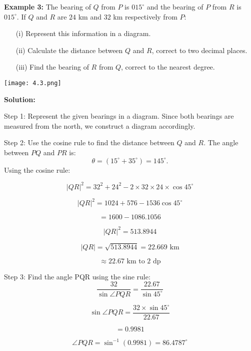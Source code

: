 \begin{flushleft}
	\textbf{Example 3:} The bearing of $Q$ from $P$ is $015^\circ$ and the bearing of $P$ from $R$ is $015^\circ$. If $Q$ and $R$ are $24$ km and $32$ km respectively from $P$:
	
	\begin{enumerate}
		\item[(i)] Represent this information in a diagram.
		\item[(ii)] Calculate the distance between $Q$ and $R$, correct to two decimal places.
		\item[(iii)] Find the bearing of $R$ from $Q$, correct to the nearest degree.
	\end{enumerate}
	
	\vspace{0.5cm}
	\begin{center}
		\texttt{[image: 4.3.png]}
	\end{center}
	
	\textbf{Solution:}
	\vspace{0.5cm}
	
	Step 1: Represent the given bearings in a diagram. Since both bearings are measured from the north, we construct a diagram accordingly.
	
	Step 2: Use the cosine rule to find the distance between $Q$ and $R$. The angle between $PQ$ and $PR$ is:
	\[
	\theta = (15^\circ + 35^\circ) = 145^\circ.
	\]
	Using the cosine rule:
	
	\[
	|QR|^2 = 32^2 + 24^2 - 2 \times 32 \times 24 \times \cos 45^\circ
	\]
	
	\[
	|QR|^2 = 1024 + 576 - 1536 \cos 45^\circ
	\]
	
	\[
	= 1600 - 1086.1056
	\]
	
	\[
	|QR|^2 = 513.8944
	\]
	
	\[
	|QR| = \sqrt{513.8944} = 22.669 \text{ km}
	\]
	
	\[
	\approx 22.67 \text{ km to 2 dp} 
	\]
	
	
	
	Step 3: Find the angle \angle PQR using the sine rule:
	\[
	\frac{32}{\sin \angle PQR} = \frac{22.67}{\sin 45^\circ}
	\]
	
	\[
	\sin \angle PQR = \frac{32 \times \sin 45^\circ}{22.67}
	\]
	
	\[
	= 0.9981
	\]
	
	\[
	\angle PQR = \sin^{-1} (0.9981) = 86.4787^\circ
	\]
	
	
	

\end{flushleft}
